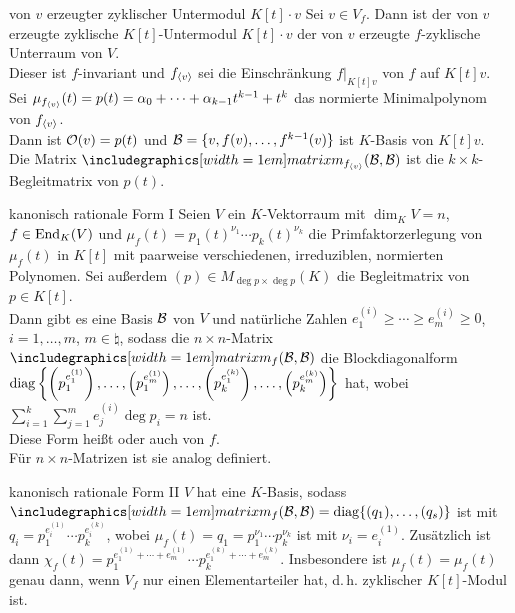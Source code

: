 \begin{Satz}{von $v$ erzeugter zyklischer Untermodul $K[t] \cdot v$}
    Sei $v \in V_f$.
    Dann ist der von $v$ erzeugte zyklische $K[t]$-Untermodul $K[t] \cdot v$
    der von $v$ erzeugte $f$-zyklische Unterraum von $V$. \\
    Dieser ist $f$-invariant und $f_{\langle v \rangle}$ sei die Einschränkung
    $f|_{K[t]v}$ von $f$ auf $K[t]v$. \\
    Sei $\mu_{f_{\langle v \rangle}}(t) = p(t) = \alpha_0 + \dotsb +
    \alpha_{k-1} t^{k-1} + t^k$ das normierte Minimalpolynom von
    $f_{\langle v \rangle}$. \\
    Dann ist $\mathcal{O}(v) = p(t)$ und
    $\mathcal{B} = \{v, f(v), \dotsc, f^{k-1}(v)\}$ ist $K$-Basis von $K[t]v$. \\
    Die Matrix $\hommatrix{f_{\aufspann{v}}}{B}{B}$ ist die
    $k \times k$-Begleitmatrix von $p(t)$.
\end{Satz}

\pagebreak

\begin{Satz}{kanonisch rationale Form I}
    Seien $V$ ein $K$-Vektorraum mit $\dim_K V = n$, $f \in \operatorname{End}_K(V)$ und
    $\mu_f(t) = p_1(t)^{\nu_1} \dotsm p_k(t)^{\nu_k}$ die Primfaktorzerlegung
    von $\mu_f(t)$ in $K[t]$ mit paarweise verschiedenen, irreduziblen,
    normierten Polynomen.
    Sei außerdem $(p) \in M_{\deg p \times \deg p}(K)$ die Begleitmatrix von
    $p \in K[t]$. \\
    Dann gibt es eine Basis $\mathcal{B}$ von $V$ und natürliche Zahlen
    $e_1^{(i)} \ge \dotsb \ge e_m^{(i)} \ge 0$, $i = 1, \dotsc, m$,
    $m \in \natural$, sodass die $n \times n$-Matrix $\hommatrix{f}{B}{B}$
    die Blockdiagonalform \\
    $\operatorname{diag}\left\{\left(p_1^{e_1^{(1)}}\right), \dotsc,
    \left(p_1^{e_m^{(1)}}\right), \dotsc,
    \left(p_k^{e_1^{(k)}}\right), \dotsc,
    \left(p_k^{e_m^{(k)}}\right)\right\}$ hat, wobei
    $\sum_{i=1}^k \sum_{j=1}^m e_j^{(i)} \deg p_i = n$ ist. \\
    Diese Form heißt  oder auch
     von $f$. \\
    Für $n \times n$-Matrizen ist sie analog definiert.
\end{Satz}

\begin{Satz}{kanonisch rationale Form II}
    $V$ hat eine $K$-Basis, sodass
    $\hommatrix{f}{B}{B} = \diag\{(q_1), \dotsc, (q_s)\}$ ist mit
    $q_i = p_1^{e_i^{(1)}} \dotsm p_k^{e_i^{(k)}}$, wobei
    $\mu_f(t) = q_1 = p_1^{\nu_1} \dotsm p_k^{\nu_k}$ ist mit
    $\nu_i = e_i^{(1)}$.
    Zusätzlich ist dann
    $\chi_f(t) = p_1^{e_1^{(1)} + \dotsb + e_m^{(1)}} \dotsm
    p_k^{e_1^{(k)} + \dotsb + e_m^{(k)}}$.
    Insbesondere ist $\mu_f(t) = \mu_f(t)$ genau dann, wenn $V_f$ nur einen
    Elementarteiler hat, d.\,h. zyklischer $K[t]$-Modul ist.
\end{Satz}

\pagebreak
